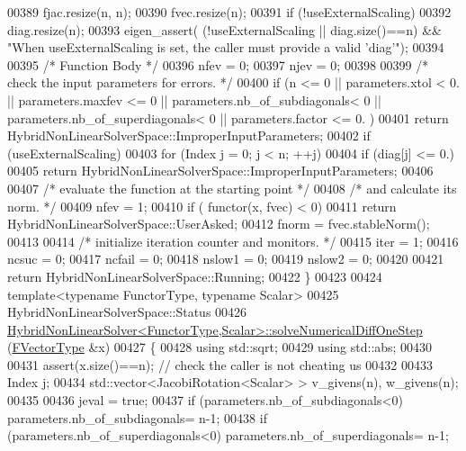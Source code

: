 \begin{DoxyCode}
00389     fjac.resize(n, n);
00390     fvec.resize(n);
00391     \textcolor{keywordflow}{if} (!useExternalScaling)
00392         diag.resize(n);
00393     eigen\_assert( (!useExternalScaling || diag.size()==n) && \textcolor{stringliteral}{"When useExternalScaling is set, the caller
       must provide a valid 'diag'"});
00394 
00395     \textcolor{comment}{/* Function Body */}
00396     nfev = 0;
00397     njev = 0;
00398 
00399     \textcolor{comment}{/*     check the input parameters for errors. */}
00400     \textcolor{keywordflow}{if} (n <= 0 || parameters.xtol < 0. || parameters.maxfev <= 0 || parameters.nb\_of\_subdiagonals< 0 || 
      parameters.nb\_of\_superdiagonals< 0 || parameters.factor <= 0. )
00401         \textcolor{keywordflow}{return} HybridNonLinearSolverSpace::ImproperInputParameters;
00402     \textcolor{keywordflow}{if} (useExternalScaling)
00403         \textcolor{keywordflow}{for} (Index j = 0; j < n; ++j)
00404             \textcolor{keywordflow}{if} (diag[j] <= 0.)
00405                 \textcolor{keywordflow}{return} HybridNonLinearSolverSpace::ImproperInputParameters;
00406 
00407     \textcolor{comment}{/*     evaluate the function at the starting point */}
00408     \textcolor{comment}{/*     and calculate its norm. */}
00409     nfev = 1;
00410     \textcolor{keywordflow}{if} ( functor(x, fvec) < 0)
00411         \textcolor{keywordflow}{return} HybridNonLinearSolverSpace::UserAsked;
00412     fnorm = fvec.stableNorm();
00413 
00414     \textcolor{comment}{/*     initialize iteration counter and monitors. */}
00415     iter = 1;
00416     ncsuc = 0;
00417     ncfail = 0;
00418     nslow1 = 0;
00419     nslow2 = 0;
00420 
00421     \textcolor{keywordflow}{return} HybridNonLinearSolverSpace::Running;
00422 \}
00423 
00424 \textcolor{keyword}{template}<\textcolor{keyword}{typename} FunctorType, \textcolor{keyword}{typename} Scalar>
00425 HybridNonLinearSolverSpace::Status
00426 \hyperlink{class_eigen_1_1_hybrid_non_linear_solver}{HybridNonLinearSolver<FunctorType,Scalar>::solveNumericalDiffOneStep}
      (\hyperlink{group___core___module}{FVectorType}  &x)
00427 \{
00428     \textcolor{keyword}{using} std::sqrt;
00429     \textcolor{keyword}{using} std::abs;
00430     
00431     assert(x.size()==n); \textcolor{comment}{// check the caller is not cheating us}
00432 
00433     Index j;
00434     std::vector<JacobiRotation<Scalar> > v\_givens(n), w\_givens(n);
00435 
00436     jeval = \textcolor{keyword}{true};
00437     \textcolor{keywordflow}{if} (parameters.nb\_of\_subdiagonals<0) parameters.nb\_of\_subdiagonals= n-1;
00438     \textcolor{keywordflow}{if} (parameters.nb\_of\_superdiagonals<0) parameters.nb\_of\_superdiagonals= n-1;

\end{DoxyCode}
